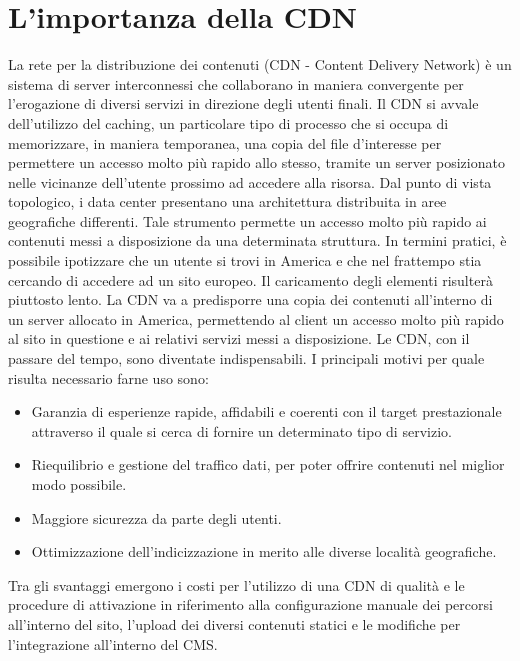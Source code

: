 \section{L'importanza della CDN}
La rete per la distribuzione dei contenuti (CDN - Content Delivery Network) è un sistema di server interconnessi che collaborano in maniera convergente per l'erogazione di diversi servizi in direzione degli utenti finali. Il CDN si avvale dell'utilizzo del caching, un particolare tipo di processo che si occupa di memorizzare, in maniera temporanea, una copia del file d'interesse per permettere un accesso molto più rapido allo stesso, tramite un server posizionato nelle vicinanze dell'utente prossimo ad accedere alla risorsa. Dal punto di vista topologico, i data center presentano una architettura distribuita in aree geografiche differenti. Tale strumento  permette un accesso molto più rapido ai contenuti messi a disposizione da una determinata struttura. \hfill \break
In termini pratici, è possibile ipotizzare che un utente si trovi in America e che nel frattempo stia cercando di accedere ad un sito europeo. Il caricamento degli elementi risulterà piuttosto lento. La CDN va a predisporre una copia dei contenuti all'interno di un server allocato in America, permettendo al client un accesso molto più rapido al sito in questione e ai relativi servizi messi a disposizione. \hfill \break
Le CDN, con il passare del tempo, sono diventate indispensabili. I principali motivi per quale risulta necessario farne uso sono:
\begin{itemize}
    \item Garanzia di esperienze rapide, affidabili e coerenti con il target prestazionale attraverso il quale si cerca di fornire un determinato tipo di servizio.
    \item Riequilibrio e gestione del traffico dati, per poter offrire contenuti nel miglior modo possibile.
    \item Maggiore sicurezza da parte degli utenti.
    \item Ottimizzazione dell'indicizzazione in merito alle diverse località geografiche.
\end{itemize}
Tra gli svantaggi emergono i costi per l'utilizzo di una CDN di qualità e le procedure di attivazione in riferimento alla configurazione manuale dei percorsi all'interno del sito, l'upload dei diversi contenuti statici e le modifiche per l'integrazione all'interno del CMS.


